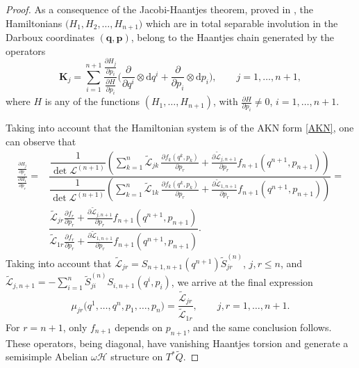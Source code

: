 \documentclass[10pt]{amsart}
\numberwithin{equation}{section}
\newcommand{\nn}{\nonumber}
\newcommand{\rd}{\mathrm{d}}
\newcommand{\bs}{\boldsymbol}
\theoremstyle{definition}
\begin{document}
	\begin{proof}
		As a consequence of the Jacobi-Haantjes theorem, proved in \cite{RTT2022CNS}, the Hamiltonians $\big(H_1,H_2,\ldots,H_{n+1}\big)$ which are in total separable involution in the Darboux coordinates $(\bs{q},\bs{p})$, belong to the Haantjes chain generated by the operators 
		\begin{equation} \label{eq:LSoV}
			\boldsymbol{K}_j=\sum _{i=1}^{n+1} \frac{\frac{\partial H_{j}}{\partial p_i}}{ \frac{\partial H}{\partial p_i}}\bigg (\frac{\partial}{\partial q^i}\otimes \rd q^i +\frac{\partial}{\partial p_i}\otimes \rd p_i \bigg ),\qquad j=1,\ldots,n+1,
		\end{equation}
		where $H$ is any of the functions $(H_1, \ldots, H_{n+1})$, with $\frac{\partial H}{\partial p_i}\neq 0$, $i=1,\ldots,n+1$.
		
		Taking into account that the Hamiltonian system is of the AKN form \eqref{AKN}, one can observe that
		\begin{align}
			\nn \frac{\frac{\partial H_{j}}{\partial p_r}}{ \frac{\partial H_1}{\partial p_r}} ={}& \dfrac{\dfrac{1}{\det \mathcal{L}^{(n+1)}} \left(\sum_{k=1}^{n} \tilde{\mathcal{L}}_{jk}\, \frac{\partial f_{k}(q^k, p_k)}{\partial{p_r}}+ \frac{\partial \tilde{\mathcal{L}}_{j,n+1}}{\partial p_r} f_{n+1}(q^{n+1}, p_{n+1})\right)}{\dfrac{1}{\det \mathcal{L}^{(n+1)}} \left(\sum_{k=1}^{n} \tilde{\mathcal{L}}_{1k}\, \frac{\partial f_{k}(q^k, p_k)}{\partial{p_r}}+ \frac{\partial \tilde{\mathcal{L}}_{1,n+1}}{\partial p_r} f_{n+1}(q^{n+1}, p_{n+1})\right)}= 	\\
			{}&  \dfrac{\tilde{\mathcal{L}}_{jr }\frac{\partial f_r}{\partial p_r}+\frac{\partial \tilde{\mathcal{L}}_{j,n+1}}{\partial p_r}f_{n+1}(q^{n+1}, p_{n+1})}{\tilde{\mathcal{L}}_{1r}\frac{\partial f_r}{\partial p_r}+\frac{\partial \tilde{\mathcal{L}}_{1,n+1}}{\partial p_r}f_{n+1}(q^{n+1}, p_{n+1}) }. 
			\end{align}
Taking into account that $\tilde{\mathcal{L}}_{jr}=S_{n+1,n+1}(q^{n+1})\tilde{S}_{jr}^{(n)}$, $j,r\leq n$, and $\tilde{\mathcal{L}}_{j,n+1}=-\sum_{i=1}^{n}\tilde{S}^{(n)}_{ji}S_{i,n+1}(q^i,p_i)$, we arrive at the final expression
\[
\mu_{jr}\big(q^1,\ldots, q^n,p_1,\ldots,p_n\big) = \dfrac{\tilde{\mathcal{L}}_{jr }}{\tilde{\mathcal{L}}_{1r}}, \qquad j,r=1,\ldots, n+1.
\]
For $r=n+1$, only $f_{n+1}$ depends on $p_{n+1}$, and the same conclusion follows. These operators, being diagonal, have vanishing Haantjes torsion and generate a semisimple Abelian $\omega \mathscr{H}$ structure on $T^{*}\tilde{Q}$.
	\end{proof}
\end{document}
